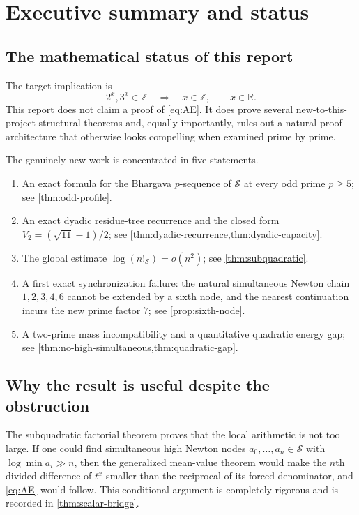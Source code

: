 \documentclass[11pt]{article}
\theoremstyle{definition}
\theoremstyle{remark}
\newcommand{\Z}{\mathbb Z}
\newcommand{\R}{\mathbb R}
\newcommand{\calS}{\mathcal S}
\begin{document}
\tableofcontents
\newpage

\section{Executive summary and status}

\subsection{The mathematical status of this report}
The target implication is
\begin{equation}\label{eq:AE}
        2^x,3^x\in\Z \quad\Longrightarrow\quad x\in\Z,
        \qquad x\in\R.
\end{equation}
This report does not claim a proof of \eqref{eq:AE}.  It does prove several new-to-this-project structural theorems and, equally importantly, rules out a natural proof architecture that otherwise looks compelling when examined prime by prime.

The genuinely new work is concentrated in five statements.
\begin{enumerate}
\item An exact formula for the Bhargava $p$-sequence of $\calS$ at every odd prime $p\ge5$; see \cref{thm:odd-profile}.
\item An exact dyadic residue-tree recurrence and the closed form
$V_2=(\sqrt{11}-1)/2$; see \cref{thm:dyadic-recurrence,thm:dyadic-capacity}.
\item The global estimate $\log(n!_{\calS})=o(n^2)$; see \cref{thm:subquadratic}.
\item A first exact synchronization failure: the natural simultaneous Newton chain
$1,2,3,4,6$ cannot be extended by a sixth node, and the nearest continuation incurs the new prime factor $7$; see \cref{prop:sixth-node}.
\item A two-prime mass incompatibility and a quantitative quadratic energy gap; see \cref{thm:no-high-simultaneous,thm:quadratic-gap}.
\end{enumerate}

\subsection{Why the result is useful despite the obstruction}
The subquadratic factorial theorem proves that the local arithmetic is not too large.  If one could find simultaneous high Newton nodes $a_0,\dots,a_n\in\calS$ with $\log\min a_i\gg n$, then the generalized mean-value theorem would make the $n$th divided difference of $t^x$ smaller than the reciprocal of its forced denominator, and \eqref{eq:AE} would follow.  This conditional argument is completely rigorous and is recorded in \cref{thm:scalar-bridge}.
\end{document}
